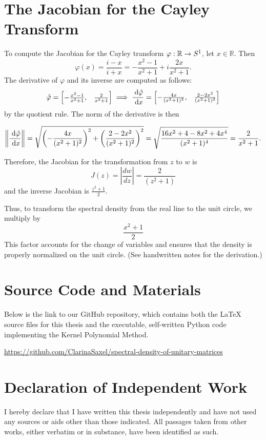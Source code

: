 \section{The Jacobian for the Cayley Transform}

To compute the Jacobian for the Cayley transform $\varphi: \mathbb{R} \to S^1$, let $x \in \mathbb{R}$. Then
\[
\varphi(x) = \frac{i - x}{i + x} = -\frac{x^2 - 1}{x^2 + 1} + i \frac{2x}{x^2 + 1}.
\]
The derivative of $\varphi$ and its inverse are computed as follows:
\[
\hat{\varphi} =
\begin{bmatrix}
    -\frac{x^2 - 1}{x^2 + 1}, & \frac{2}{x^2 + 1} \\
\end{bmatrix}
\implies \frac{\;\mathrm{d}\hat{\varphi}}{\;\mathrm{d}x} =
\begin{bmatrix}
    -\frac{4x}{(x^2 + 1)^2}, & \frac{2 - 2x^2}{(x^2 + 1)^2} \\
\end{bmatrix}
\]
by the quotient rule. The norm of the derivative is then

\[
\left \| \frac{\;\mathrm{d}\hat{\varphi}}{\;\mathrm{d}x} \right \| = \sqrt{\left(-\frac{4x}{(x^2 + 1)^2}\right)^2 + \left(\frac{2 - 2x^2}{(x^2 + 1)^2}\right)^2} = \sqrt{\frac{16x^2 + 4 - 8x^2 + 4x^4}{(x^2 + 1)^4}} = \frac{2}{x^2 + 1}.
\]

Therefore, the Jacobian for the transformation from $z$ to $w$ is
\[
J(z) = \left| \frac{dw}{dz} \right| = \frac{2}{(z^2 + 1)}
\]
and the inverse Jacobian is $\frac{z^2 + 1}{2}$.

Thus, to transform the spectral density from the real line to the unit circle, we multiply by
\[
\frac{x^2 + 1}{2}
\]
This factor accounts for the change of variables and ensures that the density is properly normalized on the unit circle. (See handwritten notes for the derivation.)

\section{Source Code and Materials}
Below is the link to our GitHub repository, which contains both the LaTeX source files for this thesis and the executable, self-written Python code implementing the Kernel Polynomial Method.

\noindent
\url{https://github.com/ClarinaSaxel/spectral-density-of-unitary-matrices}

\section{Declaration of Independent Work}
I hereby declare that I have written this thesis independently and have not used any sources or aids other than those indicated. All passages taken from other works, either verbatim or in substance, have been identified as such.

